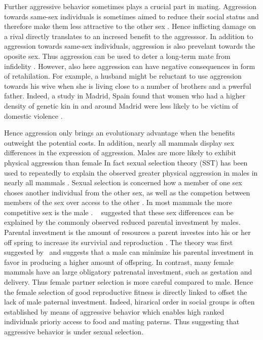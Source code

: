 Further aggressive behavior sometimes plays a crucial part in mating.
Aggression towards same-sex individuals is sometimes aimed to reduce their social status and therefore make them less attractive to the other sex \cite{Buss1990}.
Hence inflicting damage on a rival directly translates to an incresed benefit to the aggresssor.
In addition to aggression towards same-sex individuals, aggression is also prevelant towards the oposite sex.
Thus aggression can be used to deter a long-term mate from infidelity \cite{Daly1982}.
However, also here aggression can have negative consequences in form of retahilation.
For example, a husband might be reluctant to use aggression towards his wive when she is living close to a number of brothers and a pwerful father.
Indeed, a study in Madrid, Spain found that women who had a higher density of genetic kin in and around Madrid were less likely to be victim of domestic violence \cite{Figueredo1995}.

Hence aggression only brings an evolutionary advantage when the benefits outweight the potential costs.
In addition, nearly all mammals display sex differences in the expression of aggression.
Males are more likely to exhibit physical aggression than female
In fact sexual selection theory (SST) has been used to repeatedly to explain the observed greater physical aggression in males in nearly all mammals	 \cite{Archer2004,Anderson2002}. 
Sexual selection is concerned how a member of one sex choses another individual from the other sex, as well as the competion between members of the sex over access to the other \cite{Darwin1859}.
In most mammals the more competitive sex is the male \cite{Archer2009}. 
~\cite{Trivers1972} suggested that these sex differences can be explained by the commonly observed reduced parental investment by males.
Parental investment is the amount of resources a parent investes into his or her off spring to increase its survivial and reproduction \cite{Archer2009}.
The theory was first suggested by~\cite{0198504403} and suggests that a male can minimize his parental investment in favor in producing a higher amount of offspring.
In contrast, many female mammals have an large obligatory patrenatal investment, such as gestation and delivery.
Thus female partner selection is more careful compared to male.
Hence the female selection of good reproductive fitness is directly linked to offset the lack of male paternal investment.
Indeed, hirarical order in social groups is often established by means of aggressive behavior which enables high ranked individuals prioriy access to food and mating paterns\cite{Lindenfors2011}. 
Thus suggesting that aggressive behavior is under sexual selection.



